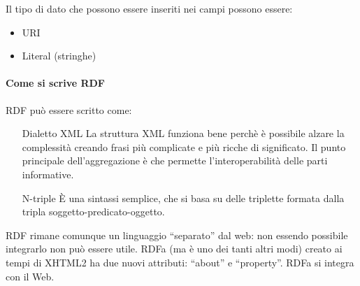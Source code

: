 Il tipo di dato che possono essere inseriti nei campi possono essere:
\begin{itemize}

\item URI
\item Literal (stringhe)

\end{itemize}

\paragraph*{Come si scrive RDF}RDF pu\`o essere scritto come:
\begin{itemize}

\item[Dialetto XML] La struttura XML funziona bene perch\`e \`e possibile alzare la complessit\`a creando frasi pi\`u complicate e pi\`u ricche di significato. Il punto principale dell'aggregazione \`e che permette l'interoperabilit\`a delle parti informative.
\item[N-triple] \`E una sintassi semplice, che si basa su delle triplette formata dalla tripla soggetto-predicato-oggetto.

\end{itemize}


RDF rimane comunque un linguaggio ``separato'' dal web: non essendo possibile integrarlo non pu\`o essere utile. RDFa (ma \`e uno dei tanti altri modi) creato ai tempi di XHTML2 ha due nuovi attributi: ``about'' e ``property''. RDFa si integra con il Web.

